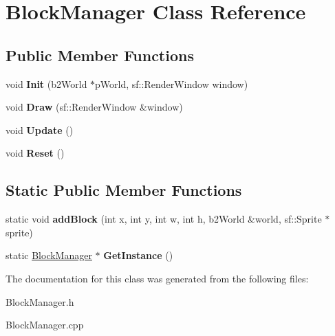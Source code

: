 \hypertarget{class_block_manager}{}\section{Block\+Manager Class Reference}
\label{class_block_manager}
\subsection*{Public Member Functions}
\begin{DoxyCompactItemize}
\item 
void {\bfseries Init} (b2\+World $\ast$p\+World, sf\+::\+Render\+Window window)\hypertarget{class_block_manager_ad6b98b4652c8abc1cbc40accfe3fb9ed}{}\label{class_block_manager_ad6b98b4652c8abc1cbc40accfe3fb9ed}

\item 
void {\bfseries Draw} (sf\+::\+Render\+Window \&window)\hypertarget{class_block_manager_a7f0487d614ceaa85265510cb360b73d8}{}\label{class_block_manager_a7f0487d614ceaa85265510cb360b73d8}

\item 
void {\bfseries Update} ()\hypertarget{class_block_manager_a4965c96fa0a175a14a6414e075d43580}{}\label{class_block_manager_a4965c96fa0a175a14a6414e075d43580}

\item 
void {\bfseries Reset} ()\hypertarget{class_block_manager_a9c39fe3b8f169c74d265572f6dffbe59}{}\label{class_block_manager_a9c39fe3b8f169c74d265572f6dffbe59}

\end{DoxyCompactItemize}
\subsection*{Static Public Member Functions}
\begin{DoxyCompactItemize}
\item 
static void {\bfseries add\+Block} (int x, int y, int w, int h, b2\+World \&world, sf\+::\+Sprite $\ast$sprite)\hypertarget{class_block_manager_ab37632de1a436c76b2bd7d16b4e09a34}{}\label{class_block_manager_ab37632de1a436c76b2bd7d16b4e09a34}

\item 
static \hyperlink{class_block_manager}{Block\+Manager} $\ast$ {\bfseries Get\+Instance} ()\hypertarget{class_block_manager_abb3806acc3374b77351673c91658e576}{}\label{class_block_manager_abb3806acc3374b77351673c91658e576}

\end{DoxyCompactItemize}


The documentation for this class was generated from the following files\+:\begin{DoxyCompactItemize}
\item 
Block\+Manager.\+h\item 
Block\+Manager.\+cpp\end{DoxyCompactItemize}
